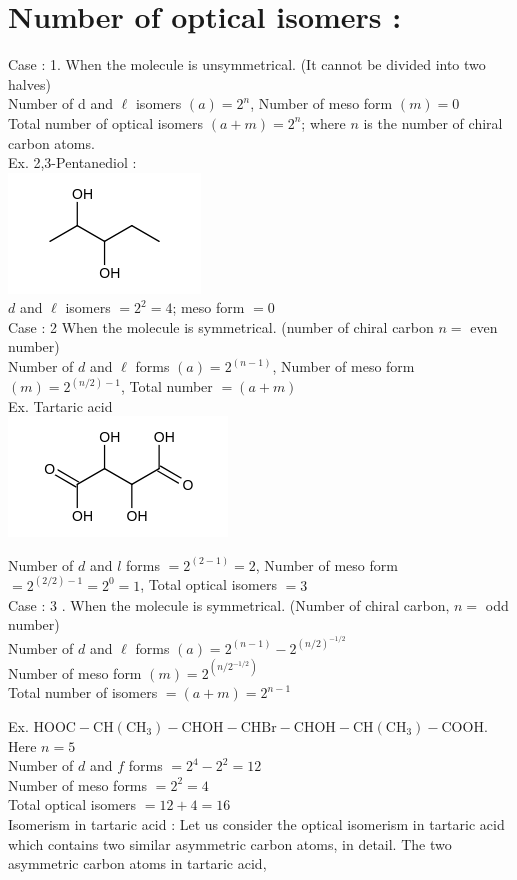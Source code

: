 \documentclass[10pt]{article}
\begin{document}
\section*{Number of optical isomers :}
Case : 1. When the molecule is unsymmetrical. (It cannot be divided into two halves)\\
Number of d and $\ell$ isomers $(a)=2^{n}$, Number of meso form $(m)=0$\\
Total number of optical isomers $(a+m)=2^{n}$; where $n$ is the number of chiral carbon atoms.\\
Ex. 2,3-Pentanediol :\\
\includegraphics{smile-910c3363bb6ba7ea53bb16c8fffa4a95147991a0}\\
$d$ and $\ell$ isomers $=2^{2}=4$; meso form $=0$\\
Case : 2 When the molecule is symmetrical. (number of chiral carbon $n=$ even number)\\
Number of $d$ and $\ell$ forms $(a)=2^{(n-1)}$, Number of meso form $(m)=2^{(n / 2)-1}$, Total number $=(a+m)$\\
Ex. Tartaric acid\\
\includegraphics{smile-f4d36c31905f22fc07f1da103e1e14076aed5281}

Number of $d$ and $l$ forms $=2^{(2-1)}=2$, Number of meso form $=2^{(2 / 2)-1}=2^{0}=1$, Total optical isomers $=3$\\
Case : 3 . When the molecule is symmetrical. (Number of chiral carbon, $n=$ odd number)\\
Number of $d$ and $\ell$ forms $(a)=2^{(n-1)}-2^{(n / 2)^{-1 / 2}}$\\
Number of meso form $(m)=2^{\left(n / 2^{-1 / 2}\right)}$\\
Total number of isomers $=(a+m)=2^{n-1}$

Ex. $\mathrm{HOOC}-\mathrm{CH}\left(\mathrm{CH}_{3}\right)-\mathrm{CHOH}-\mathrm{CHBr}-\mathrm{CHOH}-\mathrm{CH}\left(\mathrm{CH}_{3}\right)-\mathrm{COOH}$. Here $n=5$\\
Number of $d$ and $f$ forms $=2^{4}-2^{2}=12$\\
Number of meso forms $=2^{2}=4$\\
Total optical isomers $=12+4=16$\\
Isomerism in tartaric acid : Let us consider the optical isomerism in tartaric acid which contains two similar asymmetric carbon atoms, in detail. The two asymmetric carbon atoms in tartaric acid,
\end{document}

